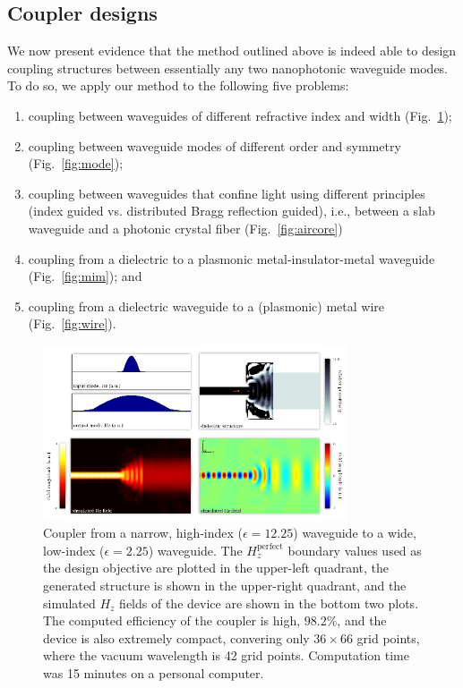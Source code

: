 \documentclass[letterpaper,10pt]{article}
\begin{document}
\subsection{Coupler designs}
We now present evidence that the method outlined above 
    is indeed able to design coupling structures between essentially
    any two nanophotonic waveguide modes.
To do so, we apply our method to the following five problems:
    \begin{enumerate}
    \item coupling between waveguides of different refractive index and width
        (Fig.~\ref{fig:fiber});
    \item coupling between waveguide modes of different order and symmetry
        (Fig.~\ref{fig:mode});
    \item coupling between waveguides that confine light 
        using different principles 
        (index guided vs. distributed Bragg reflection guided), 
        i.e., between a slab waveguide and a photonic crystal fiber
        (Fig.~\ref{fig:aircore})
    \item coupling from a dielectric to a plasmonic metal-insulator-metal 
        waveguide (Fig.~\ref{fig:mim}); and
    \item coupling from a dielectric waveguide to a (plasmonic) metal wire
        (Fig.~\ref{fig:wire}).
    \end{enumerate}
\begin{figure}[htbp]
    \centering
    \includegraphics[width=0.8\textwidth]{1} 
    \caption{Coupler from a narrow, high-index ($\epsilon=12.25$) waveguide to
            a wide, low-index ($\epsilon=2.25$) waveguide. 
        The $H_z^\text{perfect}$ boundary values used as 
            the design objective are plotted in the upper-left quadrant, 
            the generated structure is shown in the upper-right quadrant, and
            the simulated $H_z$ fields of the device are shown 
            in the bottom two plots.
        The computed efficiency of the coupler is high, $98.2\%$, and
            the device is also extremely compact, 
            convering only $36 \times 66$ grid points,
            where the vacuum wavelength is 42 grid points.
        Computation time was 15 minutes on a personal computer.}
    \label{fig:fiber}
\end{figure}
\end{document}
